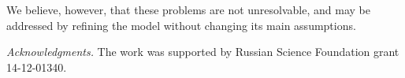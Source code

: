 \documentclass{article}
\begin{document}
	We believe, however, that these problems are not unresolvable, and may be addressed by refining the model without changing its main assumptions.

	{\small {\it Acknowledgments.} The work was supported by Russian Science Foundation grant 14-12-01340.}



\end{document}
